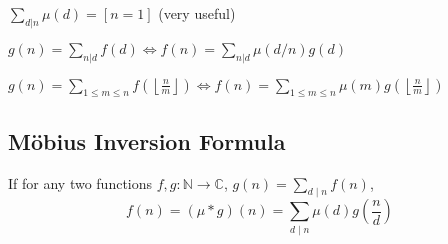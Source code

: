   $ \sum_{d | n} \mu(d) = [ n = 1] $ (very useful)

  $ g(n) = \sum_{n|d} f(d) \Leftrightarrow f(n) = \sum_{n|d} \mu(d/n)g(d)$

 $ g(n) = \sum_{1 \leq m \leq n} f(\left\lfloor\frac{n}{m}\right \rfloor ) \Leftrightarrow f(n) = \sum_{1\leq m\leq n} \mu(m)g(\left\lfloor\frac{n}{m}\right\rfloor)$

\subsection{Möbius Inversion Formula}
    If for any two functions $f, g : \mathbb{N} \to \mathbb{C}$, $g(n) = \sum_{d \mid n} f(n)$,
    \[ f(n) = (\mu * g)(n) = \sum_{d \mid n} \mu(d) g \left(\frac{n}{d}\right) \]
